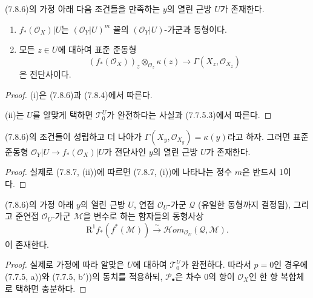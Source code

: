 \begin{corollary}[7.8.7]
(7.8.6)의 가정 아래 다음 조건들을 만족하는 $y$의 열린 근방 $U$가
존재한다.
\begin{enumerate}
  \item[(i)] $f_*(\mathscr O_X)|U$는 $(\mathscr O_Y|U)^m$ 꼴의
    $(\mathscr O_Y|U)$-가군과 동형이다.
  \item[(ii)] 모든 $z\in U$에 대하여 표준 준동형
    \[
      (f_*(\mathscr O_X))_z
      \otimes_{\mathscr O_z}\kappa(z)
      \longrightarrow
      \Gamma(X_z,\mathscr O_{X_z})
    \]
    은 전단사이다.
\end{enumerate}
\end{corollary}

\begin{proof}
(i)은 (7.8.6)과 (7.8.4)에서 따른다.

(ii)는 $U$를 알맞게 택하면 $\mathscr T_0^U$가 완전하다는 사실과
(7.7.5.3)에서 따른다.
\end{proof}

\begin{corollary}[7.8.8]
(7.8.6)의 조건들이 성립하고 더 나아가
$\Gamma(X_y,\mathscr O_{X_y})=\kappa(y)$라고 하자. 그러면 표준
준동형 $\mathscr O_Y|U\to f_*(\mathscr O_X)|U$가 전단사인 $y$의 열린
근방 $U$가 존재한다.
\end{corollary}

\begin{proof}
실제로 (7.8.7, (ii))에 따르면 (7.8.7, (i))에 나타나는 정수 $m$은
반드시 1이다.
\end{proof}

\begin{corollary}[7.8.9]
(7.8.6)의 가정 아래 $y$의 열린 근방 $U$, 연접 $\mathscr O_U$-가군
$\mathscr Q$ (유일한 동형까지 결정됨), 그리고 준연접
$\mathscr O_U$-가군 $\mathscr M$을 변수로 하는 함자들의 동형사상
\[
  \mathrm R^1f_*(f^*(\mathscr M))
  \xrightarrow{\sim}
  \mathscr{H}\!om_{\mathscr O_U}(\mathscr Q,\mathscr M).
  \tag{7.8.9.1}\label{III.7.8.9.1.fr}
\]
이 존재한다.
\end{corollary}

\begin{proof}
실제로 가정에 따라 알맞은 $U$에 대하여 $\mathscr T_0^U$가 완전하다.
따라서 $p=0$인 경우에 (7.7.5, a))와 (7.7.5, b$'$))의 동치를 적용하되,
$\mathscr P_\bullet$은 차수 0의 항이 $\mathscr O_X$인 한 항 복합체로
택하면 충분하다.
\end{proof}

